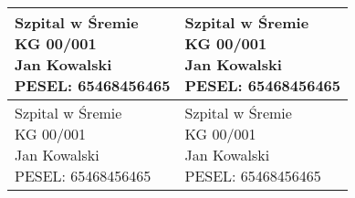 \documentclass[a4paper,5pt]{article}
\date{}
\begin{document}
   
    \begin{table}[H]        
        \begin{tabular}{ |b{105mm} | b{105mm} |}
            \hline
            \parbox[c][148mm]{105mm}{Szpital w Śremie \newline KG 00/001 \newline Jan Kowalski \newline   PESEL: 65468456465} &
            \parbox[c][148mm]{105mm}{Szpital w Śremie \newline KG 00/001 \newline Jan Kowalski \newline   PESEL: 65468456465} \\ \hline
            \parbox[c][148mm]{105mm}{Szpital w Śremie \newline KG 00/001 \newline Jan Kowalski \newline   PESEL: 65468456465} &
            \parbox[c][148mm]{105mm}{Szpital w Śremie \newline KG 00/001 \newline Jan Kowalski \newline   PESEL: 65468456465} \\
        \hline        
        \end{tabular}
        \end{table}
    
\end{document}
